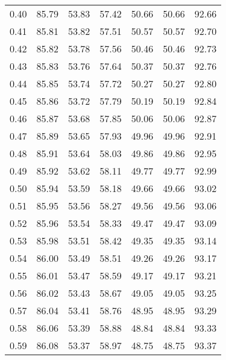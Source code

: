 \begin{tabular}{|c|c|c|c|c|c|c|}
      0.40 &     85.79 &     53.83 &      57.42 &   50.66 &      50.66 &         92.66 \\
      0.41 &     85.81 &     53.82 &      57.51 &   50.57 &      50.57 &         92.70 \\
      0.42 &     85.82 &     53.78 &      57.56 &   50.46 &      50.46 &         92.73 \\
      0.43 &     85.83 &     53.76 &      57.64 &   50.37 &      50.37 &         92.76 \\
      0.44 &     85.85 &     53.74 &      57.72 &   50.27 &      50.27 &         92.80 \\
      0.45 &     85.86 &     53.72 &      57.79 &   50.19 &      50.19 &         92.84 \\
      0.46 &     85.87 &     53.68 &      57.85 &   50.06 &      50.06 &         92.87 \\
      0.47 &     85.89 &     53.65 &      57.93 &   49.96 &      49.96 &         92.91 \\
      0.48 &     85.91 &     53.64 &      58.03 &   49.86 &      49.86 &         92.95 \\
      0.49 &     85.92 &     53.62 &      58.11 &   49.77 &      49.77 &         92.99 \\
      0.50 &     85.94 &     53.59 &      58.18 &   49.66 &      49.66 &         93.02 \\
      0.51 &     85.95 &     53.56 &      58.27 &   49.56 &      49.56 &         93.06 \\
      0.52 &     85.96 &     53.54 &      58.33 &   49.47 &      49.47 &         93.09 \\
      0.53 &     85.98 &     53.51 &      58.42 &   49.35 &      49.35 &         93.14 \\
      0.54 &     86.00 &     53.49 &      58.51 &   49.26 &      49.26 &         93.17 \\
      0.55 &     86.01 &     53.47 &      58.59 &   49.17 &      49.17 &         93.21 \\
      0.56 &     86.02 &     53.43 &      58.67 &   49.05 &      49.05 &         93.25 \\
      0.57 &     86.04 &     53.41 &      58.76 &   48.95 &      48.95 &         93.29 \\
      0.58 &     86.06 &     53.39 &      58.88 &   48.84 &      48.84 &         93.33 \\
      0.59 &     86.08 &     53.37 &      58.97 &   48.75 &      48.75 &         93.37 \\

\end{tabular}
